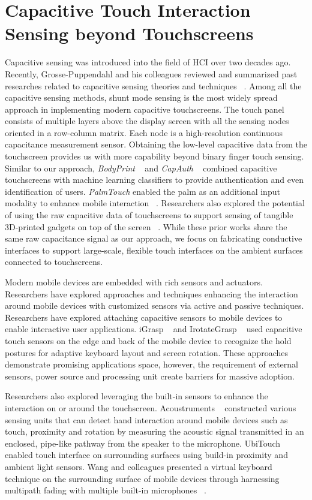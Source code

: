 \section{Capacitive Touch Interaction Sensing beyond Touchscreens}
Capacitive sensing was introduced into the field of HCI over two decades ago. Recently, Grosse-Puppendahl and his colleagues reviewed and summarized past researches related to capacitive sensing theories and techniques ~\cite{Grosse-Puppendahl-capacitive}. Among all the capacitive sensing methods, shunt mode sensing is the most widely spread approach in implementing modern capacitive touchscreens. The touch panel consists of multiple layers above the display screen with all the sensing nodes oriented in a row-column matrix. Each node is a high-resolution continuous capacitance measurement sensor. Obtaining the low-level capacitive data from the touchscreen provides us with more capability beyond binary finger touch sensing. Similar to our approach, \textit{BodyPrint} ~\cite{Holz-bodyprint} and \textit{CapAuth} ~\cite{Guo2015} combined capacitive touchscreens with machine learning classifiers to provide authentication and even identification of users. \textit{PalmTouch} enabled the palm as an additional input modality to enhance mobile interaction ~\cite{Le-palmtouch}. Researchers also explored the potential of using the raw capacitive data of touchscreens to support sensing of tangible 3D-printed gadgets on top of the screen ~\cite{Chan-CapStones, Schmitz2017, Schmitz2018}. While these prior works share the same raw capacitance signal as our approach, we focus on fabricating conductive interfaces to support large-scale, flexible touch interfaces on the ambient surfaces connected to touchscreens.

Modern mobile devices are embedded with rich sensors and actuators. Researchers have explored approaches and techniques enhancing the interaction around mobile devices with customized sensors via active and passive techniques. Researchers have explored attaching capacitive sensors to mobile devices to enable interactive user applications. iGrasp ~\cite{Cheng2013a} and IrotateGrasp ~\cite{Cheng-2013-IrotateGrasp} used capacitive touch sensors on the edge and back of the mobile device to recognize the hold postures for adaptive keyboard layout and screen rotation. These approaches demonstrate promising applications space, however, the requirement of external sensors, power source and processing unit create barriers for massive adoption.

Researchers also explored leveraging the built-in sensors to enhance the interaction on or around the touchscreen. Acoustruments ~\cite{laput2015acoustruments} constructed various sensing units that can detect hand interaction around mobile devices such as touch, proximity and rotation by measuring the acoustic signal transmitted in an enclosed, pipe-like pathway from the speaker to the microphone. UbiTouch ~\cite{wen2016ubitouch} enabled touch interface on surrounding surfaces using build-in proximity and ambient light sensors. Wang and colleagues presented a virtual keyboard technique on the surrounding surface of mobile devices through harnessing multipath fading with multiple built-in microphones ~\cite{wang2014ubiquitous}. 

